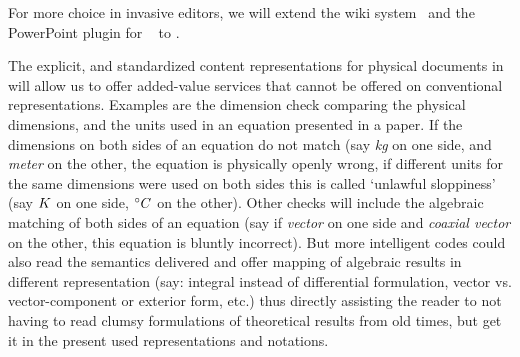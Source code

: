 For more choice in invasive editors, we will extend the {\omdoc} wiki
system~\cite{LanKoh:swmkm06} and the PowerPoint plugin for {\omdoc}~\cite{KohKoh:cdad04}
to {\physml}.

The explicit, and standardized content representations for physical documents in {\physml}
will allow us to offer added-value services that cannot be offered on conventional
representations.  Examples are the dimension check comparing the physical dimensions, and
the units used in an equation presented in a paper. If the dimensions on both sides of an
equation do not match (say {\emph{kg}} on one side, and {\emph{meter}} on the other, the
equation is physically openly wrong, if different units for the same dimensions were used
on both sides this is called `unlawful sloppiness' (say $K$ on one side, ${}^{\circ}C$
on the other).  Other checks will include the algebraic matching of both sides of an
equation (say if {\emph{vector}} on one side and {\emph{coaxial vector}} on the other,
this equation is bluntly incorrect). But more intelligent codes could also read the
semantics delivered and offer mapping of algebraic results in different representation
(say: integral instead of differential formulation, vector vs.  vector-component or
exterior form, etc.) thus directly assisting the reader to not having to read clumsy
formulations of theoretical results from old times, but get it in the present used
representations and notations.

